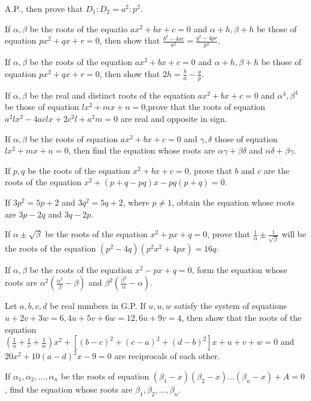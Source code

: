   A.P., then prove that $D_1:D_2 = a^2:p^2$.
\item If $\alpha, \beta$ be the roots of the equatio $ax^2 + bx + c = 0$ and $\alpha + h, \beta + h$ be those of equation $px^2 +
  qx + r = 0$, then show that $\frac{b^2 - 4ac}{a^2} = \frac{q^2 - 4pr}{p^2}$.
\item If $\alpha, \beta$ be the roots of the equation $ax^2 + bx + c =0$ and $\alpha + h, \beta + h$ be those of equation $px^2 +
  qx + r = 0$, then show that $2h = \frac{b}{a} - \frac{q}{p}$.
\item If $\alpha, \beta$ be the real and distinct roots of the equation $ax^2 + bx + c = 0$ and $\alpha^4, \beta^4$ be those of
  equation $lx^2 + mx + n = 0$,prove that the roots of equation $a^2lx^2 - 4aclx + 2c^2l + a^2m = 0$ are real and opposite in sign.
\item If $\alpha, \beta$ be the roots of equation $ax^2 + bx + c = 0$ and $\gamma, \delta$ those of equation $lx^2 + mx + n = 0$,
  then find the equation whose roots are $\alpha\gamma + \beta\delta$ and $\alpha\delta + \beta\gamma$.
\item If $p, q$ be the roots of the equation $x^2 + bx + c = 0$, prove that $b$ and $c$ are the roots of the equation $x^2 + (p + q
  - pq)x - pq(p + q) = 0$.
\item If $3p^2 = 5p + 2$ and $3q^2 = 5q + 2$, where $p\neq 1$, obtain the equation whose roots are $3p - 2q$ and $3q - 2p$.
\item If $\alpha\pm\sqrt{\beta}$ be the roots of the equation $x^2 + px + q = 0$, prove that $\frac{1}{\alpha}\pm
  \frac{1}{\sqrt{\beta}}$ will be the roots of the equation $(p^2 - 4q)(p^2x^2 + 4px) = 16q$.
\item If $\alpha, \beta$ be the roots of the equation $x^2 - px + q = 0$, form the equation whose roots are
  $\alpha^2\left(\frac{\alpha^2}{\beta} -\beta\right)$ and $\beta^2\left(\frac{\beta^2}{\alpha} - \alpha\right)$.
\item Let $a, b, c, d$ be real numbers in G.P. If $u, u, w$ satisfy the system of equations $u + 2v + 3w = 6, 4u + 5v + 6w = 12, 6u
  + 9v = 4$, then show that the roots of the equation $\left(\frac{1}{u} + \frac{1}{v} + \frac{1}{w}\right)x^2 +[(b - c)^2 + (c -
    a)^2 + (d - b)^2]x + u + v + w = 0$ and $20x^2 + 10(a - d)^2x - 9 = 0$ are reciprocals of each other.
\item If $\alpha_1, \alpha_2, \ldots, \alpha_n$ be the roots of equation $(\beta_1 - x)(\beta_2 - x)\ldots (\beta_n - x) + A = 0$,
  find the equation whose roots are $\beta_1, \beta_2, \ldots, \beta_n$.
